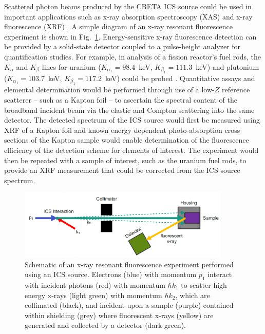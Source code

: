 \documentclass[../main.tex]{subfiles}
\begin{document}
Scattered photon beams produced by the CBETA ICS source could be used in important applications such as x-ray absorption spectroscopy (XAS) and x-ray fluorescence (XRF) \cite{willmott2019introduction}. A simple diagram of an x-ray resonant fluorescence experiment is shown in Fig.~\ref{fig:XRF_diagram}. Energy-sensitive x-ray fluorescence detection can be provided by a solid-state detector coupled to a pulse-height analyzer for quantification studies. For example, in analysis of a fission reactor's fuel rods, the $K_{\alpha}$ and $K_{\beta}$ lines for uranium ($K_{\alpha_{1}} = 98.4$~\si{\kilo\electronvolt}, $K_{\beta_{1}} = 111.3$~\si{\kilo\electronvolt}) and plutonium ($K_{\alpha_{1}} = 103.7$~\si{\kilo\electronvolt}, $K_{\beta_{1}} = 117.2$~\si{\kilo\electronvolt}) could be probed \cite{havrilla2015feasibility}. Quantitative assays and elemental determination would be performed through use of a low-$Z$ reference scatterer -- such as a Kapton foil -- to ascertain the spectral content of the broadband incident beam via the elastic and Compton scattering into the same detector. The detected spectrum of the ICS source would first be measured using XRF of a Kapton foil and known energy dependent photo-absorption cross sections of the Kapton sample would enable determination of the fluorescence efficiency of the detection scheme for elements of interest. The experiment would then be repeated with a sample of interest, such as the uranium fuel rods, to provide an XRF measurement that could be corrected from the ICS source spectrum. 
\begin{figure}[!h]
\centering
\includegraphics[width=0.9\textwidth]{Figures/CBETA_Inverse_Compton_Source_Design/XRF_diagram_fixed.pdf}
\caption{Schematic of an x-ray resonant fluorescence experiment performed using an ICS source. Electrons (blue) with momentum $p_{1}$ interact with incident photons (red) with momentum $\hbar k_{1}$ to scatter high energy x-rays (light green) with momentum $\hbar k_{2}$, which are collimated (black), and incident upon a sample (purple) contained within shielding (grey) where fluorescent x-rays (yellow) are generated and collected by a detector (dark green).}
\label{fig:XRF_diagram}
\end{figure}
\end{document}
